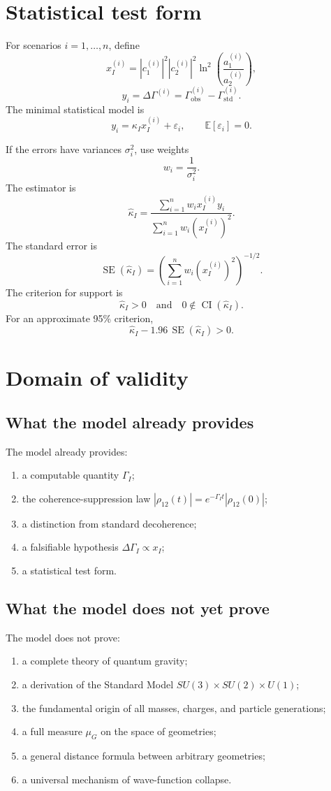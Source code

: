 \documentclass[12pt,a4paper]{article}
\DeclareMathOperator{\SE}{SE}
\DeclareMathOperator{\CI}{CI}
\newcommand{\std}{\mathrm{std}}
\newcommand{\obs}{\mathrm{obs}}
\begin{document}
\section{Statistical test form}

For scenarios \(i=1,\dots,n\), define
\[
x_I^{(i)}=|c_1^{(i)}|^2|c_2^{(i)}|^2
\ln^2\left(\frac{a_1^{(i)}}{a_2^{(i)}}\right),
\]
\[
y_i=\Delta\Gamma^{(i)}=\Gamma_{\obs}^{(i)}-\Gamma_{\std}^{(i)}.
\]
The minimal statistical model is
\[
\boxed{
y_i=\kappa_I x_I^{(i)}+\varepsilon_i,
\qquad
\mathbb E[\varepsilon_i]=0.
}
\]

If the errors have variances \(\sigma_i^2\), use weights
\[
w_i=\frac{1}{\sigma_i^2}.
\]
The estimator is
\[
\boxed{
\hat\kappa_I=
\frac{\sum_{i=1}^n w_i x_I^{(i)}y_i}{\sum_{i=1}^n w_i(x_I^{(i)})^2}.
}
\]
The standard error is
\[
\boxed{
\SE(\hat\kappa_I)=
\left(\sum_{i=1}^n w_i(x_I^{(i)})^2\right)^{-1/2}.
}
\]
The criterion for support is
\[
\boxed{
\hat\kappa_I>0
\quad\text{and}\quad
0\notin \CI(\hat\kappa_I).
}
\]
For an approximate 95\% criterion,
\[
\boxed{
\hat\kappa_I-1.96\,\SE(\hat\kappa_I)>0.
}
\]

\section{Domain of validity}

\subsection{What the model already provides}

The model already provides:
\begin{enumerate}[label=\arabic*.]
\item a computable quantity \(\Gamma_I\);
\item the coherence-suppression law \(|\rho_{12}(t)|=e^{-\Gamma_I t}|\rho_{12}(0)|\);
\item a distinction from standard decoherence;
\item a falsifiable hypothesis \(\Delta\Gamma_I\propto x_I\);
\item a statistical test form.
\end{enumerate}

\subsection{What the model does not yet prove}

The model does not prove:
\begin{enumerate}[label=\arabic*.]
\item a complete theory of quantum gravity;
\item a derivation of the Standard Model \(SU(3)\times SU(2)\times U(1)\);
\item the fundamental origin of all masses, charges, and particle generations;
\item a full measure \(\mu_G\) on the space of geometries;
\item a general distance formula between arbitrary geometries;
\item a universal mechanism of wave-function collapse.
\end{enumerate}
\end{document}
